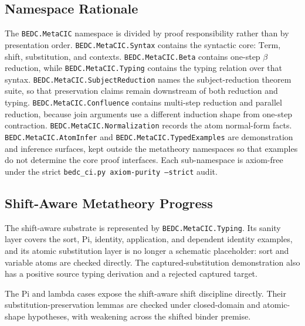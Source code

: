 \subsection{Namespace Rationale}\label{subsec:reconstruction-namespace-rationale}

The \texttt{BEDC.MetaCIC} namespace is divided by proof responsibility rather
than by presentation order. \texttt{BEDC.MetaCIC.Syntax} contains the
syntactic core: $\mathrm{Term}$, shift, substitution, and contexts.
\texttt{BEDC.MetaCIC.Beta} contains one-step $\beta$ reduction, while
\texttt{BEDC.MetaCIC.Typing} contains the typing relation over that syntax.
\texttt{BEDC.MetaCIC.SubjectReduction} names the subject-reduction theorem
suite, so that preservation claims remain downstream of both reduction and
typing. \texttt{BEDC.MetaCIC.Confluence} contains multi-step reduction and
parallel reduction, because join arguments use a different induction shape
from one-step contraction. \texttt{BEDC.MetaCIC.Normalization} records the
atom normal-form facts. \texttt{BEDC.MetaCIC.AtomInfer} and
\texttt{BEDC.MetaCIC.TypedExamples} are demonstration and inference surfaces,
kept outside the metatheory namespaces so that examples do not determine the
core proof interfaces. Each sub-namespace is axiom-free under the strict
\texttt{bedc\_ci.py axiom-purity --strict} audit.





\subsection{Shift-Aware Metatheory Progress}\label{subsec:shift-aware-metatheory-progress}

The shift-aware substrate is represented by \texttt{BEDC.MetaCIC.Typing}. Its
sanity layer covers the sort, Pi, identity, application, and dependent
identity examples, and its atomic substitution layer is no longer a schematic
placeholder: sort and variable atoms are checked directly.
The captured-substitution demonstration also has a positive source typing
derivation and a rejected captured target.

The Pi and lambda cases expose the shift-aware shift discipline directly. Their
substitution-preservation lemmas are checked under closed-domain and
atomic-shape hypotheses, with weakening across the shifted binder premise.

